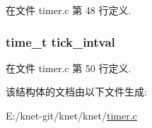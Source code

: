 在文件 timer.\+c 第 48 行定义.

\hypertarget{struct__ktimer__loop__t_a0856d0e2658f936061e29b6429eb0852}{}
\subsubsection[{tick\+\_\+intval}]{\setlength{\rightskip}{0pt plus 5cm}time\+\_\+t tick\+\_\+intval}\label{struct__ktimer__loop__t_a0856d0e2658f936061e29b6429eb0852}


在文件 timer.\+c 第 50 行定义.



该结构体的文档由以下文件生成\+:\begin{DoxyCompactItemize}
\item 
E\+:/knet-\/git/knet/knet/\hyperlink{knet_2timer_8c}{timer.\+c}\end{DoxyCompactItemize}

